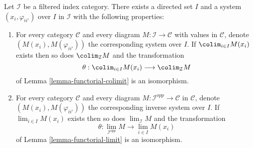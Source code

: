 \begin{lemma}
\label{lemma-directed-category-system}
Let $\mathcal{I}$ be a filtered index category.
There exists a directed set $I$
and a system $(x_i, \varphi_{ii'})$ over $I$ in $\mathcal{I}$
with the following properties:
\begin{enumerate}
\item For every category $\mathcal{C}$ and every diagram
$M : \mathcal{I} \to \mathcal{C}$ with values in $\mathcal{C}$,
denote $(M(x_i), M(\varphi_{ii'}))$
the corresponding system over $I$. If
$\colim_{i \in I} M(x_i)$ exists then so does
$\colim_\mathcal{I} M$ and the transformation
$$
\theta :
\colim_{i \in I} M(x_i)
\longrightarrow
\colim_\mathcal{I} M
$$
of Lemma \ref{lemma-functorial-colimit} is an isomorphism.
\item For every category $\mathcal{C}$ and every diagram
$M : \mathcal{I}^{opp} \to \mathcal{C}$ in $\mathcal{C}$, denote
$(M(x_i), M(\varphi_{ii'}))$ the corresponding inverse system
over $I$. If $\lim_{i \in I} M(x_i)$ exists then so does
$\lim_\mathcal{I} M$ and the transformation
$$
\theta :
\lim_{\mathcal{I}^{opp}} M
\longrightarrow
\lim_{i \in I} M(x_i)
$$
of Lemma \ref{lemma-functorial-limit} is an isomorphism.
\end{enumerate}
\end{lemma}

